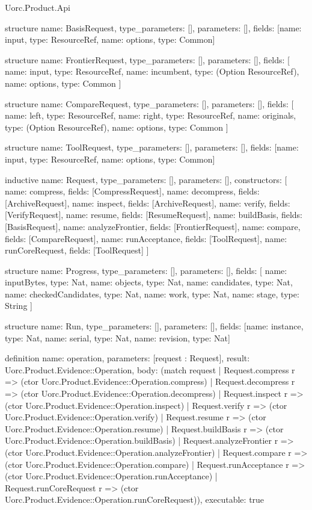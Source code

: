 \begin{lexlean}{Uorc.Product.Api}
\begin{semanticmodule}
structure{
  name: BasisRequest,
  type_parameters: [],
  parameters: [],
  fields: [{name: input, type: ResourceRef}, {name: options, type: Common}]
}

structure{
  name: FrontierRequest,
  type_parameters: [],
  parameters: [],
  fields: [
    {name: input, type: ResourceRef},
    {name: incumbent, type: (Option ResourceRef)},
    {name: options, type: Common}
  ]
}

structure{
  name: CompareRequest,
  type_parameters: [],
  parameters: [],
  fields: [
    {name: left, type: ResourceRef},
    {name: right, type: ResourceRef},
    {name: originals, type: (Option ResourceRef)},
    {name: options, type: Common}
  ]
}

structure{
  name: ToolRequest,
  type_parameters: [],
  parameters: [],
  fields: [{name: input, type: ResourceRef}, {name: options, type: Common}]
}

inductive{
  name: Request,
  type_parameters: [],
  parameters: [],
  constructors: [
    {name: compress, fields: [CompressRequest]},
    {name: decompress, fields: [ArchiveRequest]},
    {name: inspect, fields: [ArchiveRequest]},
    {name: verify, fields: [VerifyRequest]},
    {name: resume, fields: [ResumeRequest]},
    {name: buildBasis, fields: [BasisRequest]},
    {name: analyzeFrontier, fields: [FrontierRequest]},
    {name: compare, fields: [CompareRequest]},
    {name: runAcceptance, fields: [ToolRequest]},
    {name: runCoreRequest, fields: [ToolRequest]}
  ]
}

structure{
  name: Progress,
  type_parameters: [],
  parameters: [],
  fields: [
    {name: inputBytes, type: Nat},
    {name: objects, type: Nat},
    {name: candidates, type: Nat},
    {name: checkedCandidates, type: Nat},
    {name: work, type: Nat},
    {name: stage, type: String}
  ]
}

structure{
  name: Run,
  type_parameters: [],
  parameters: [],
  fields: [{name: instance, type: Nat}, {name: serial, type: Nat}, {name: revision, type: Nat}]
}

definition{
  name: operation,
  parameters: [request : Request],
  result: Uorc.Product.Evidence::Operation,
  body: (match request
    | Request.compress r => (ctor Uorc.Product.Evidence::Operation.compress)
    | Request.decompress r => (ctor Uorc.Product.Evidence::Operation.decompress)
    | Request.inspect r => (ctor Uorc.Product.Evidence::Operation.inspect)
    | Request.verify r => (ctor Uorc.Product.Evidence::Operation.verify)
    | Request.resume r => (ctor Uorc.Product.Evidence::Operation.resume)
    | Request.buildBasis r => (ctor Uorc.Product.Evidence::Operation.buildBasis)
    | Request.analyzeFrontier r => (ctor Uorc.Product.Evidence::Operation.analyzeFrontier)
    | Request.compare r => (ctor Uorc.Product.Evidence::Operation.compare)
    | Request.runAcceptance r => (ctor Uorc.Product.Evidence::Operation.runAcceptance)
    | Request.runCoreRequest r => (ctor Uorc.Product.Evidence::Operation.runCoreRequest)),
  executable: true
}


\end{semanticmodule}
\end{lexlean}
